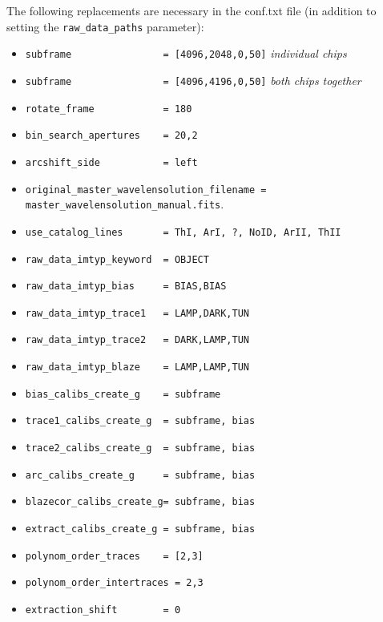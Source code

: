 \documentclass[10pt,a4paper]{article}
\begin{document}
\noindent The following replacements are necessary in the conf.txt file (in addition to setting the \verb|raw_data_paths| parameter):
\begin{itemize}\small\setlength\itemsep{-0.1cm}
  \small
  \item \verb|subframe                = [4096,2048,0,50]| \textit{individual chips}
  \item \verb|subframe                = [4096,4196,0,50]| \textit{both chips together}
  \item \verb|rotate_frame            = 180|
  \item \verb|bin_search_apertures    = 20,2|
  \item \verb|arcshift_side           = left|
  \item \verb|original_master_wavelensolution_filename = master_wavelensolution_manual.fits|.
  \item \verb|use_catalog_lines 	  = ThI, ArI, ?, NoID, ArII, ThII|
  \item \verb|raw_data_imtyp_keyword  = OBJECT|
  \item \verb|raw_data_imtyp_bias     = BIAS,BIAS|
  \item \verb|raw_data_imtyp_trace1   = LAMP,DARK,TUN|
  \item \verb|raw_data_imtyp_trace2   = DARK,LAMP,TUN|
  \item \verb|raw_data_imtyp_blaze    = LAMP,LAMP,TUN|
  \item \verb|bias_calibs_create_g    = subframe|
  \item \verb|trace1_calibs_create_g  = subframe, bias|
  \item \verb|trace2_calibs_create_g  = subframe, bias|
  \item \verb|arc_calibs_create_g     = subframe, bias|
  \item \verb|blazecor_calibs_create_g= subframe, bias|
  \item \verb|extract_calibs_create_g = subframe, bias|
  \item \verb|polynom_order_traces    = [2,3]|
  \item \verb|polynom_order_intertraces = 2,3|
  \item \verb|extraction_shift        = 0|
\end{itemize}
\end{document}
